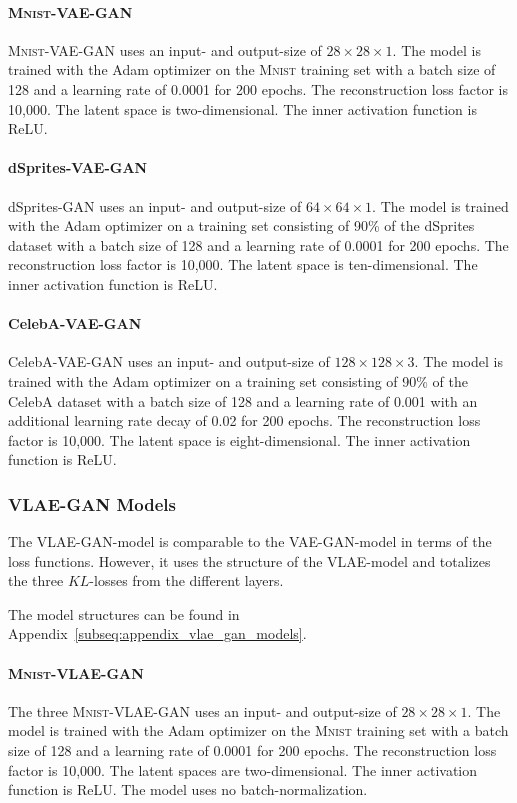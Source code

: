 \paragraph{\textsc{Mnist}-\ac{VAE}-\ac{GAN}} \textsc{Mnist}-\ac{VAE}-\ac{GAN} uses an input- and output-size of $28\times 28\times 1$.
The model is trained with the Adam optimizer on the \textsc{Mnist} training set with a batch size of 128 and a learning rate of 0.0001 for 200 epochs.
The reconstruction loss factor is 10,000.
The latent space is two-dimensional.
The inner activation function is ReLU.

\paragraph{dSprites-\ac{VAE}-\ac{GAN}} dSprites-\ac{GAN} uses an input- and output-size of $64\times 64\times 1$.
The model is trained with the Adam optimizer on a training set consisting of 90\% of the dSprites dataset with a batch size of 128 and a learning rate of 0.0001 for 200 epochs.
The reconstruction loss factor is 10,000.
The latent space is ten-dimensional.
The inner activation function is ReLU.

\paragraph{CelebA-\ac{VAE}-\ac{GAN}} CelebA-\ac{VAE}-\ac{GAN} uses an input- and output-size of $128\times 128\times 3$.
The model is trained with the Adam optimizer on a training set consisting of 90\% of the CelebA dataset with a batch size of 128 and a learning rate of 0.001 with an additional learning rate decay of 0.02 for 200 epochs.
The reconstruction loss factor is 10,000.
The latent space is eight-dimensional.
The inner activation function is ReLU.

\subsubsection{VLAE-GAN Models}\label{subsubsec:vlae_gan_models}

The \ac{VLAE}-\ac{GAN}-model is comparable to the \ac{VAE}-\ac{GAN}-model in terms of the loss functions.
However, it uses the structure of the \ac{VLAE}-model and totalizes the three $KL$-losses from the different layers.

The model structures can be found in Appendix~\ref{subseq:appendix_vlae_gan_models}.

\paragraph{\textsc{Mnist}-\ac{VLAE}-\ac{GAN}} The three \textsc{Mnist}-\ac{VLAE}-\ac{GAN} uses an input- and output-size of $28\times 28\times 1$.
The model is trained with the Adam optimizer on the \textsc{Mnist} training set with a batch size of 128 and a learning rate of 0.0001 for 200 epochs.
The reconstruction loss factor is 10,000.
The latent spaces are two-dimensional.
The inner activation function is ReLU.
The model uses no batch-normalization.

